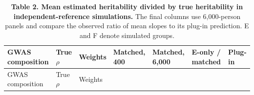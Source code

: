 \documentclass[11pt,a4paper]{article}
\begin{document}
\begin{longtable}[]{@{}
  >{\raggedright\arraybackslash}p{}
  >{\raggedleft\arraybackslash}p{}
  >{\raggedright\arraybackslash}p{}
  >{\raggedleft\arraybackslash}p{}
  >{\raggedleft\arraybackslash}p{}
  >{\raggedleft\arraybackslash}p{}
  >{\raggedleft\arraybackslash}p{}@{}}
\caption{\textbf{Table 2. Mean estimated heritability divided by true heritability in independent-reference simulations.} The final columns use 6,000-person panels and compare the observed ratio of mean slopes to its plug-in prediction. E and F denote simulated groups.}\tabularnewline
\toprule\noalign{}
\begin{minipage}[b]{\linewidth}\raggedright
GWAS composition
\end{minipage} & \begin{minipage}[b]{\linewidth}\raggedleft
True \(\rho\)
\end{minipage} & \begin{minipage}[b]{\linewidth}\raggedright
Weights
\end{minipage} & \begin{minipage}[b]{\linewidth}\raggedleft
Matched, 400
\end{minipage} & \begin{minipage}[b]{\linewidth}\raggedleft
Matched, 6,000
\end{minipage} & \begin{minipage}[b]{\linewidth}\raggedleft
E-only / matched
\end{minipage} & \begin{minipage}[b]{\linewidth}\raggedleft
Plug-in
\end{minipage} \\
\midrule\noalign{}
\endfirsthead
\toprule\noalign{}
\begin{minipage}[b]{\linewidth}\raggedright
GWAS composition
\end{minipage} & \begin{minipage}[b]{\linewidth}\raggedleft
True \(\rho\)
\end{minipage} & \begin{minipage}[b]{\linewidth}\raggedright
Weights
\end{minipage} & \begin{minipage}[b]{\linewidth}\raggedleft

\end{minipage}
\end{longtable}
\end{document}
